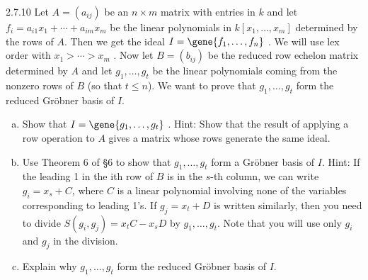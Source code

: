 \documentclass[twoside]{article}
\begin{document}
\begin{ejercicio}{2.7.10}
Let $A = (a_{ij} )$ be an $n × m$ matrix with entries in $k$ and let $f_i = a_{i1} x_1 +\cdots + a_{im} x_m$ be the
linear polynomials in $k[x_1 ,\dots, x_m ]$ determined by the rows of $A$. Then we get the ideal
$I = \gene{f_1 ,\dots , f_n}$ . We will use lex order with $x_1 > \cdots > x_m$ . Now let $B = (b_{ij} )$ be the
reduced row echelon matrix determined by $A$ and let $g_1 ,\dots , g_t$ be the linear polynomials
coming from the nonzero rows of $B$ (so that $t ≤ n$). We want to prove that $g_1 ,\dots , g_t$
form the reduced Gröbner basis of $I$.
\begin{enumerate}[a.]
\item Show that $I =\gene{ g_1 ,\dots , g_t}$ . Hint: Show that the result of applying a row operation to
$A$ gives a matrix whose rows generate the same ideal.
\item Use Theorem 6 of §6 to show that $g_1 , \dots, g_t$ form a Gröbner basis of $I$. Hint: If the
leading 1 in the ith row of $B$ is in the $s$-th column, we can write $g_i = x_s + C$, where $C$
is a linear polynomial involving none of the variables corresponding to leading 1’s.
If $g_j = x_t + D$ is written similarly, then you need to divide $S(g_i , g_j ) = x_t C − x_s D$ by
$g_1 ,\dots , g_t$. Note that you will use only $g_i$ and $g_j$ in the division.
\item Explain why $g_1 ,\dots , g_t$ form the reduced Gröbner basis of $I$.
\end{enumerate}
\end{ejercicio}
\end{document}
